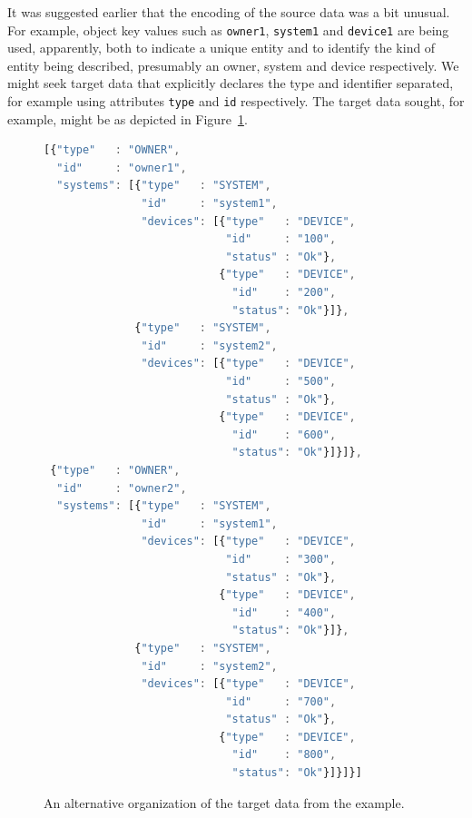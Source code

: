 \documentclass[9pt,letterpaper]{article}
\newcommand{\stt}[1]{\texttt{#1}} %
\begin{document}
It was suggested earlier that the encoding of the source data was a bit unusual.
For example, object key values such as \stt{owner1}, \stt{system1} and \stt{device1} are being used, apparently, both to indicate a unique entity and to identify the kind of entity being described, presumably an owner, system and device respectively.
We might seek target data that explicitly declares the type and identifier separated, for example using attributes \stt{type} and \stt{id} respectively.
The target data sought, for example, might be as depicted in Figure~\ref{data:slack-with-keys}.

\begin{figure}[H]
  \caption{An alternative organization of the target data from the example.}
 \label{data:slack-with-keys}
\begin{lstlisting}[language=JavaScript,basicstyle=\ttfamily\scriptsize,numberstyle=\scriptsize]
[{"type"   : "OWNER",
  "id"     : "owner1",
  "systems": [{"type"   : "SYSTEM",
               "id"     : "system1",
               "devices": [{"type"   : "DEVICE",
                            "id"     : "100",
                            "status" : "Ok"},
                           {"type"   : "DEVICE",
                             "id"    : "200",
                             "status": "Ok"}]},
              {"type"   : "SYSTEM",
               "id"     : "system2",
               "devices": [{"type"   : "DEVICE",
                            "id"     : "500",
                            "status" : "Ok"},
                           {"type"   : "DEVICE",
                             "id"    : "600",
                             "status": "Ok"}]}]},
 {"type"   : "OWNER",
  "id"     : "owner2",
  "systems": [{"type"   : "SYSTEM",
               "id"     : "system1",
               "devices": [{"type"   : "DEVICE",
                            "id"     : "300",
                            "status" : "Ok"},
                           {"type"   : "DEVICE",
                             "id"    : "400",
                             "status": "Ok"}]},
              {"type"   : "SYSTEM",
               "id"     : "system2",
               "devices": [{"type"   : "DEVICE",
                            "id"     : "700",
                            "status" : "Ok"},
                           {"type"   : "DEVICE",
                             "id"    : "800",
                             "status": "Ok"}]}]}]
\end{lstlisting}
\end{figure}  \vspace{-2em}
\end{document}
